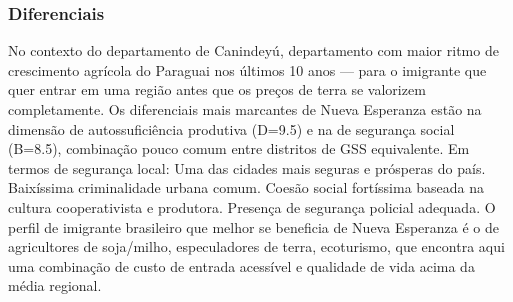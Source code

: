 \subsubsection*{Diferenciais}\label{dif-nueva-esperanza-1410}
No contexto do departamento de Canindeyú, departamento com maior ritmo de crescimento agrícola do Paraguai nos últimos 10 anos — para o imigrante que quer entrar em uma região antes que os preços de terra se valorizem completamente. Os diferenciais mais marcantes de Nueva Esperanza estão na dimensão de autossuficiência produtiva (D=9.5) e na de segurança social (B=8.5), combinação pouco comum entre distritos de GSS equivalente. Em termos de segurança local: Uma das cidades mais seguras e prósperas do país. Baixíssima criminalidade urbana comum. Coesão social fortíssima baseada na cultura cooperativista e produtora. Presença de segurança policial adequada. O perfil de imigrante brasileiro que melhor se beneficia de Nueva Esperanza é o de agricultores de soja/milho, especuladores de terra, ecoturismo, que encontra aqui uma combinação de custo de entrada acessível e qualidade de vida acima da média regional.
